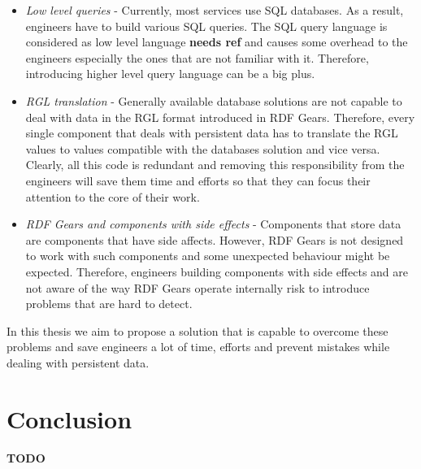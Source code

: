 \begin{itemize}
	\item \textit{Low level queries} - Currently, most services use SQL databases. As a result, engineers have to build various SQL queries. The SQL query language is considered as low level language \textbf{needs ref} and causes some overhead to the engineers especially the ones that are not familiar with it. Therefore, introducing higher level query language can be a big plus.
	
	\item \textit{RGL translation} - Generally available database solutions are not capable to deal with data in the RGL format introduced in RDF Gears. Therefore, every single component that deals with persistent data has to translate the RGL values to values compatible with the databases solution and vice versa. Clearly, all this code is redundant and removing this responsibility from the engineers will save them time and efforts so that they can focus their attention to the core of their work.
	
	\item \textit{RDF Gears and components with side effects} - Components that store data are components that have side affects. However, RDF Gears is not designed to work with such components and some unexpected behaviour might be expected. Therefore, engineers building components with side effects and are not aware of the way RDF Gears operate internally risk to introduce problems that are hard to detect.
	
\end{itemize}

In this thesis we aim to propose a solution that is capable to overcome these problems and save engineers a lot of time, efforts and prevent mistakes while dealing with persistent data.

\section{Conclusion}

\textbf{TODO}

